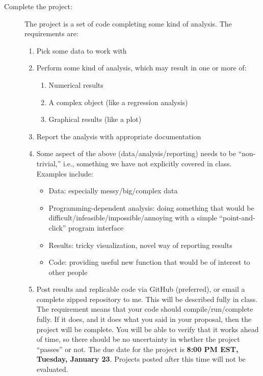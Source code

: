 \documentclass{tufte-handout}
\begin{document}
\begin{description}
\item[{Complete the project:}] The project is a set of code completing some kind of analysis. The requirements are:
\begin{enumerate}
\item Pick some data to work with
\item Perform some kind of analysis, which may result in one or more of:
\begin{enumerate}
\item Numerical results
\item A complex object (like a regression analysis)
\item Graphical results (like a plot)
\end{enumerate}
\item Report the analysis with appropriate documentation
\item Some aspect of the above (data/analysis/reporting) needs to be ``non-trivial,'' i.e., something we have not explicitly covered in class.  Examples include:
\begin{itemize}
\item Data: especially messy/big/complex data 
\item Programming-dependent analysis: doing something that would be difficult/infeasible/impossible/annoying with a simple ``point-and-click'' program interface 
\item Results: tricky visualization, novel way of reporting results 
\item Code: providing useful new function that would be of interest to other people 
\end{itemize}
\item Post results and replicable code via GitHub (preferred), or email a complete zipped repository to me. This will be described fully in class. The requirement means that your code should compile/run/complete fully. If it does, and it does what you said in your proposal, then the project will be complete.  You will be able to verify that it works ahead of time, so there should be no uncertainty in whether the project ``passes'' or not. The due date  for the project is \textbf{8:00 PM EST, Tuesday, January 23}. Projects posted after this time will not be evaluated.
\end{enumerate}
\end{description}
\end{document}
